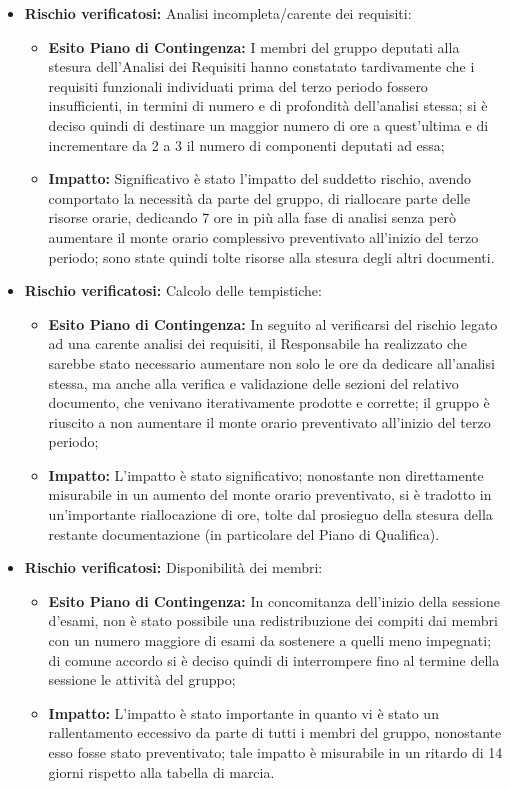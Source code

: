 \begin{itemize}
\item \textbf{Rischio verificatosi:} Analisi incompleta/carente dei requisiti:
\begin{itemize}
\item \textbf{Esito Piano di Contingenza:} I membri del gruppo deputati alla stesura dell'Analisi dei Requisiti hanno constatato tardivamente che i requisiti funzionali individuati prima del terzo periodo fossero insufficienti, in termini di numero e di profondità dell'analisi stessa; si è deciso quindi di destinare un maggior numero di ore a quest'ultima e di incrementare da 2 a 3 il numero di componenti deputati ad essa;
\item \textbf{Impatto:} Significativo è stato l'impatto del suddetto rischio, avendo comportato la necessità da parte del gruppo, di riallocare parte delle risorse orarie, dedicando 7 ore in più alla fase di analisi senza però aumentare il monte orario complessivo preventivato all'inizio del terzo periodo; sono state quindi tolte risorse alla stesura degli altri documenti.
\end{itemize}

\item \textbf{Rischio verificatosi:} Calcolo delle tempistiche:
\begin{itemize}
\item \textbf{Esito Piano di Contingenza:} In seguito al verificarsi del rischio legato ad una carente analisi dei requisiti, il Responsabile ha realizzato che sarebbe stato necessario aumentare non solo le ore da dedicare all'analisi stessa, ma anche alla verifica e validazione delle sezioni del relativo documento, che venivano iterativamente prodotte e corrette; il gruppo è riuscito a non aumentare il monte orario preventivato all'inizio del terzo periodo;
\item \textbf{Impatto:} L'impatto è stato significativo; nonostante non direttamente misurabile in un aumento del monte orario preventivato, si è tradotto in un'importante riallocazione di ore, tolte dal prosieguo della stesura della restante documentazione (in particolare del Piano di Qualifica).
\end{itemize}\pagebreak
\item \textbf{Rischio verificatosi:} Disponibilità dei membri:
\begin{itemize}
    \item \textbf{Esito Piano di Contingenza:} In concomitanza dell'inizio della sessione d'esami, non è stato possibile una redistribuzione dei compiti dai membri con un numero maggiore di esami da sostenere a quelli meno impegnati; di comune accordo si è deciso quindi di interrompere fino al termine della sessione le attività del gruppo;
    \item \textbf{Impatto:} L'impatto è stato importante in quanto vi è stato un rallentamento eccessivo da parte di tutti i membri del gruppo, nonostante esso fosse stato preventivato; tale impatto è misurabile in un ritardo di 14 giorni rispetto alla tabella di marcia.
\end{itemize}
\end{itemize}

